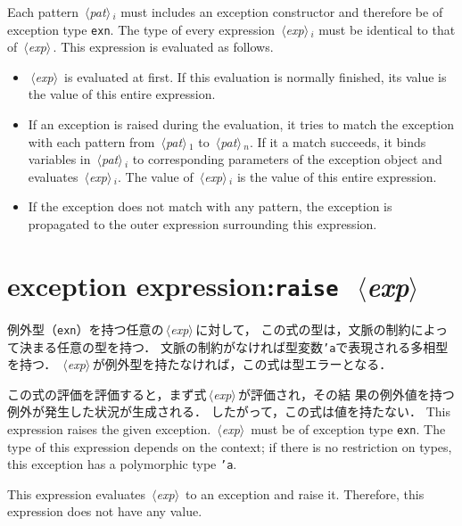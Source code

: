 \documentclass{jbook}
\newcommand{\txt}[2]{#2}
\newcommand{\code}[1]{\mbox{\large\tt #1}}
\newcommand{\nonterm}[1]{\mbox{$\,\langle$}{\it #1}\mbox{$\rangle\,$}}
\newcommand{\term}[1]{\mbox{{\tt #1}}}
\begin{document}
	Each pattern \nonterm{pat}$_i$ must includes an exception
constructor and therefore be of exception type \code{exn}.
	The type of every expression \nonterm{exp}$_i$ must be
identical to that of \nonterm{exp}.
	This expression is evaluated as follows.
\begin{itemize}
\item \nonterm{exp} is evaluated at first.
	If this evaluation is normally finished,
its value is the value of this entire expression.
\item If an exception is raised during the evaluation,
it tries to match the exception with each pattern from
\nonterm{pat}$_1$ to \nonterm{pat}$_n$.
	If it a match succeeds, it binds variables
in \nonterm{pat}$_i$ to corresponding parameters of the exception
object and evaluates \nonterm{exp}$_i$.
	The value of \nonterm{exp}$_i$ is the value of this entire
expression.
\item If the exception does not match with any pattern,
the exception is propagated to the outer expression surrounding
this expression.
\end{itemize}	
\fi%

\section{\txt{例外発生式}{exception expression}:\term{raise}\ \nonterm{exp}}
\label{sec:expression:raise}

\ifjp%
	例外型（\code{exn}）を持つ任意の\nonterm{exp}に対して，
この式の型は，文脈の制約によって決まる任意の型を持つ．
	文脈の制約がなければ型変数\code{'a}で表現される多相型を持つ．
	\nonterm{exp}が例外型を持たなければ，この式は型エラーとなる．

	この式の評価を評価すると，まず式\nonterm{exp}が評価され，その結
果の例外値を持つ例外が発生した状況が生成される．
	したがって，この式は値を持たない．
\else%
	This expression raises the given exception.
        \nonterm{exp} must be of exception type \code{exn}.
	The type of this expression depends on the context;
if there is no restriction on types,
this exception has a polymorphic type \code{'a}.

	This expression evaluates \nonterm{exp} to an exception
and raise it.
	Therefore, this expression does not have any value.
\fi%
\end{document}
